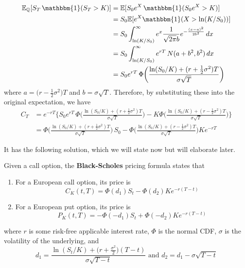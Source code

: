 \documentclass{article}
\begin{document}
    \begin{align}
      \mathbb{E}_{\mathbb{Q}} [S_T \, \mathbbm{1} (S_T > K)] & = \mathbb{E} [S_0 e^X \, \mathbbm{1} (S_0 e^X > K)] \\
                                                             & = S_0 \mathbb{E} [ e^X \mathbbm{1}(X > \ln (K/S_0))] \\
                                                             & = S_0 \int_{\ln(K/S_0)}^\infty e^x \frac{1}{\sqrt{2 \pi} b} e^{-\frac{(x - a)^2}{2 b^2}} \,dx \\
                                                             & = S_0 \int_{\ln(K/S_0)}^\infty e^{rT} \, N(a + b^2, b^2) \,dx \\ 
                                                             & = S_0 e^{rT} \, \Phi \bigg( \frac{\ln(S_0 /K) + (r + \frac{1}{2} \sigma^2) T}{\sigma \sqrt{T}} \bigg)
    \end{align}
    where $a = \big( r - \frac{1}{2} \sigma^2 \big) T$ and $b = \sigma \sqrt{T}$. Therefore, by substituting these into the original expectation, we have 
    \begin{align}
      C_T & = e^{-rT} \bigg\{ S_0 e^{rT} \, \Phi \bigg( \frac{\ln(S_0 /K) + (r + \frac{1}{2} \sigma^2) T}{\sigma \sqrt{T}} \bigg) - K \Phi \bigg( \frac{\ln(S_0 /K) + (r - \frac{1}{2} \sigma^2) T}{\sigma \sqrt{T}} \bigg) \bigg\} \\
          & = \Phi \bigg( \frac{\ln(S_0 /K) + (r + \frac{1}{2} \sigma^2) T}{\sigma \sqrt{T}} \bigg) \, S_0 - \Phi \bigg( \frac{\ln(S_0 /K) + (r - \frac{1}{2} \sigma^2) T}{\sigma \sqrt{T}} \bigg) K e^{-r T}
    \end{align}

    It has the following solution, which we will state now but will elaborate later. 

    \begin{definition}
      \label{def:black-scholes-option-pricing-formula}
      Given a call option, the \textbf{Black-Scholes} pricing formula states that 
      \begin{enumerate}
        \item For a European call option, its price is 
        \begin{equation}
          C_K (t, T) = \Phi(d_1) S_t - \Phi (d_2) K e^{-r (T - t)}
        \end{equation}

        \item For a European put option, its price is 
        \begin{equation}
          P_K (t, T) = -\Phi(-d_1) S_t + \Phi (-d_2) K e^{-r (T - t)}
        \end{equation}
      \end{enumerate}
      where $r$ is some risk-free applicable interest rate, $\Phi$ is the normal CDF, $\sigma$ is the volatility of the underlying, and 
      \begin{equation}
        d_1 = \frac{\ln (S_t / K) + \big( r + \frac{\sigma^2}{2}\big) (T - t)}{\sigma \sqrt{T - t}} \text{ and } d_2 = d_1 - \sigma \sqrt{T - t}
      \end{equation}
    \end{definition}
\end{document}
